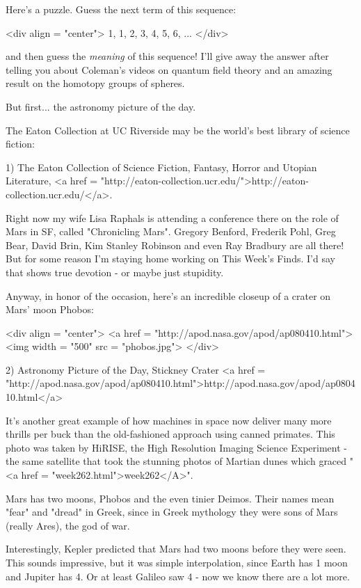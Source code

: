 


Here's a puzzle.  Guess the next term of this sequence:

<div align = "center">
1, 1, 2, 3, 4, 5, 6, ...
</div>

and then guess the \emph{meaning} of this sequence!  I'll give away
the answer after telling you about Coleman's videos on quantum
field theory and an amazing result on the homotopy groups of spheres.

But first... the astronomy picture of the day.

The Eaton Collection at UC Riverside may be the world's best
library of science fiction: 

1) The Eaton Collection of Science Fiction, Fantasy, Horror 
and Utopian Literature, <a href = "http://eaton-collection.ucr.edu/">http://eaton-collection.ucr.edu/</a>.

Right now my wife Lisa Raphals is attending a conference there on the
role of Mars in SF, called "Chronicling Mars".  Gregory Benford, 
Frederik Pohl, Greg Bear, David Brin, Kim Stanley Robinson and 
even Ray Bradbury are all there!  But for some reason I'm staying 
home working on This Week's Finds.  I'd say that shows true devotion - 
or maybe just stupidity.

Anyway, in honor of the occasion, here's an incredible closeup of a 
crater on Mars' moon Phobos:

<div align = "center">
<a href = "http://apod.nasa.gov/apod/ap080410.html">
<img width = "500" src = "phobos.jpg">
</div>

2) Astronomy Picture of the Day, Stickney Crater
<a href = "http://apod.nasa.gov/apod/ap080410.html">http://apod.nasa.gov/apod/ap080410.html</a>

It's another great example of how machines in space now deliver many
more thrills per buck than the old-fashioned approach using canned
primates.  This photo was taken by HiRISE, the High Resolution Imaging
Science Experiment - the same satellite that took the stunning photos
of Martian dunes which graced "<a href =
"week262.html">week262</A>".

Mars has two moons, Phobos and the even tinier Deimos.  Their names
mean "fear" and "dread" in Greek, since in Greek
mythology they were sons of Mars (really Ares), the god of war.

Interestingly, Kepler predicted that Mars had two moons before
they were seen.  This sounds impressive, but it was simple 
interpolation, since Earth has 1 moon and Jupiter has 4.  Or at
least Galileo saw 4 - now we know there are a lot more.

